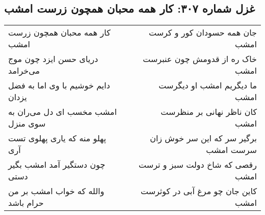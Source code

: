 \begin{center}
\section*{غزل شماره ۳۰۷: کار همه محبان همچون زرست امشب}
\label{sec:0307}
\begin{longtable}{l p{0.5cm} r}
کار همه محبان همچون زرست امشب
&&
جان همه حسودان کور و کرست امشب
\\
دریای حسن ایزد چون موج می‌خرامد
&&
خاک ره از قدومش چون عنبرست امشب
\\
دایم خوشیم با وی اما به فضل یزدان
&&
ما دیگریم امشب او دیگرست امشب
\\
امشب مخسب ای دل می‌ران به سوی منزل
&&
کان ناظر نهانی بر منظرست امشب
\\
پهلو منه که یاری پهلوی تست آری
&&
برگیر سر که این سر خوش زان سرست امشب
\\
چون دستگیر آمد امشب بگیر دستی
&&
رقصی که شاخ دولت سبز و ترست امشب
\\
والله که خواب امشب بر من حرام باشد
&&
کاین جان چو مرغ آبی در کوثرست امشب
\\
\end{longtable}
\end{center}

